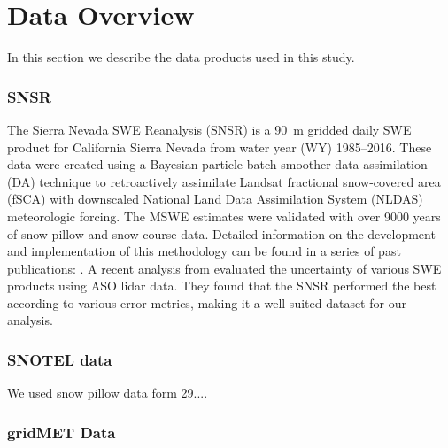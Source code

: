 \hypertarget{ch2-do-1}{\section{Data Overview}\label{ch2-do-1}}

In this section we describe the data products used in this study.

\hypertarget{ch2-do-2}{\subsubsection{SNSR}\label{ch2-do-2}}


The Sierra Nevada SWE Reanalysis (SNSR) \citep{margulisLandsatEraSierraNevada2016} is a 90~m gridded daily SWE product for California Sierra Nevada from water year (WY) 1985--2016. These data were created using a Bayesian particle batch smoother data assimilation (DA) technique to retroactively assimilate Landsat fractional snow-covered area (fSCA) with downscaled National Land Data Assimilation System (NLDAS) meteorologic forcing. The MSWE estimates were validated with over 9000 years of snow pillow and snow course data. Detailed information on the development and implementation of this methodology can be found in a series of past publications: \cite{durandBayesianApproachSnow2008, girottoExaminingSpatialTemporal2014, girottoProbabilisticSWEReanalysis2014, margulisParticleBatchSmoother2015}. A recent analysis from \citep{yangIntercomparisonSnowWater2023} evaluated the uncertainty of various SWE products using ASO lidar data. They found that the SNSR performed the best according to various error metrics, making it a well-suited dataset for our analysis.

\hypertarget{ch2-do-2}{\subsubsection{SNOTEL data}\label{ch2-do-2}}

We used snow pillow data form 29....

\hypertarget{ch2-do-2}{\subsubsection{gridMET Data}\label{ch2-do-2}}

